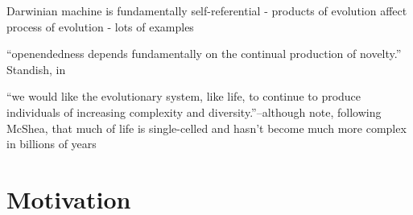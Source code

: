 \begin{DRAFT}
Darwinian machine is fundamentally self-referential - products of evolution affect process of evolution - lots of examples \parencite{Watson2015}

``openendedness depends fundamentally on the continual production of novelty.'' Standish, in \parencite{Soros2014}

``we would like the evolutionary system, like life, to continue to produce individuals of increasing complexity and diversity.''--although note, following McShea, that much of life is single-celled and hasn't become much more complex in billions of years \parencite{Maley1999}

\end{DRAFT}

\section{Motivation}\label{motivation}

